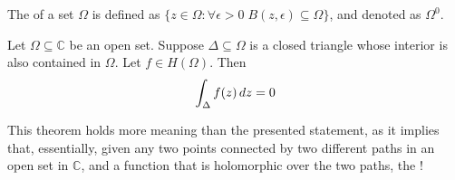 \documentclass[11pt, oneside]{book}
\begin{document}
\begin{note}[Recall]
	The  of a set $\Omega$ is defined as $\{z \in \Omega : \forall \epsilon > 0 \; B(z, \epsilon) \subseteq \Omega\}$, and denoted as $\Omega^0$.
\end{note}

\begin{thm}\label{thm:goursat_s_theorem}
	Let $\Omega \subseteq \mathbb{C}$ be an open set. Suppose $\Delta \subseteq \Omega$ is a closed triangle whose interior is also contained in $\Omega$. Let $f \in H(\Omega)$. Then
	\begin{equation*}
		\int_{\Delta} f(z) \mathop{}\!d{z} = 0
	\end{equation*}
\end{thm}

This theorem holds more meaning than the presented statement, as it implies that, essentially, given any two points connected by two different paths in an open set in $\mathbb{C}$, and a function that is holomorphic over the two paths, the !
\end{document}
